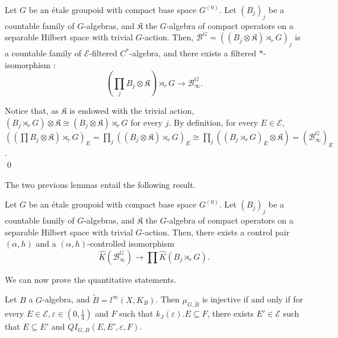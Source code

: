 \begin{lem} Let $G$ be an étale groupoid with compact base space $G^{(0)}$. Let $(B_j)_j$ be a countable family of $G$-algebras, and $\mathfrak K$ the $G$-algebra of compact operators on a separable Hilbert space with trivial $G$-action. Then, $\mathcal B^G = ((B_j\otimes \mathfrak K)\rtimes_r G)_j$ is a countable family of $\mathcal E$-filtered $C^*$-algebra, and there exists a filtered $*$-isomorphism :
\[ (\prod_j B_j\otimes\mathfrak K)\rtimes_r G \rightarrow  \mathcal B^G_\infty.\]
\end{lem}

\begin{dem} Notice that, as $\mathfrak K$ is endowed with the trivial action, $(B_j\rtimes_r G)\otimes\mathfrak K \cong (B_j\otimes\mathfrak K)\rtimes_r G$ for every $j$. By definition, for every $E\in \mathcal E$,  $\left( (\prod B_j\otimes\mathfrak K)\rtimes_r G \right)_E = \prod_j \left( (B_j\otimes\mathfrak K)\rtimes_r G\right)_E \cong \prod_j \left((B_j\rtimes_r G)_E \otimes \mathfrak K \right) = (\mathcal B^G_\infty )_E$.\\
\qed
\end{dem}

The two previous lemmas entail the following result.

\begin{cor} \label{controlledprod} Let $G$ be an étale groupoid with compact base space $G^{(0)}$. Let $(B_j)_j$ be a countable family of $G$-algebras, and $\mathfrak K$ the $G$-algebra of compact operators on a separable Hilbert space with trivial $G$-action. Then, there exists a control pair $(\alpha, h)$ and a $(\alpha, h)$-controlled isomorphism
\[ \hat K(\mathcal B^G_\infty) \rightarrow \prod \hat K(B_j\rtimes_r G). \]
\end{cor}
We can now prove the quantitative statements.\\

\begin{thm}\label{Quant1}
Let $B$ a $G$-algebra, and $\tilde B = l^\infty(X,K_B)$. Then $\mu_{G,\tilde B}$ is injective if and only if for every $E\in\mathcal E,\varepsilon\in(0,\frac{1}{4})$ and $F$ such that $k_J(\varepsilon).E\subseteq F$, there exists $E' \in\mathcal E$ such that $E\subseteq E'$ and $QI_{G,B}(E,E',\varepsilon,F)$. 
\end{thm}

